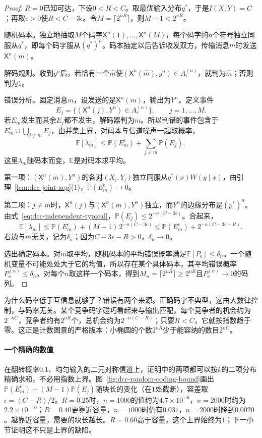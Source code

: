 \begin{proof}
$R=0$已知可达，下设$0<R<C$。取最优输入分布$q^{*}$，于是$I(X;Y)=C$；再取$\epsilon>0$使$R<C-3\epsilon$。令$M=\lceil2^{nR}\rceil$，则$M-1<2^{nR}$。

随机码本。独立地抽取$M$个码字$\mathsf{X}^n(1),\dots,\mathsf{X}^n(M)$，每个码字的$n$个符号独立同服从$q^{*}$，即每个码字服从$(q^{*})^n$。码本抽定以后告诉收发双方，传输消息$m$时发送$\mathsf{X}^n(m)$。

解码规则。收到$y^n$后，若恰有一个$\hat{m}$使$(\mathsf{X}^n(\hat{m}),y^n)\in A_{\epsilon}^{(n)}$，就判为$\hat{m}$；否则判为$1$。

错误分析。固定消息$m$，设发送的是$\mathsf{X}^n(m)$，输出为$Y^n$。定义事件
\[
 E_j=\bigl\{(\mathsf{X}^n(j),Y^n)\in A_{\epsilon}^{(n)}\bigr\},\qquad j=1,\dots,M .
\]
若$E_m$发生而其余$E_j$都不发生，解码器判为$m$。所以判错的事件包含于$E_m^{\mathrm{c}}\cup\bigcup_{j\neq m}E_j$，由并集上界，对码本与信道噪声一起取概率，
\[
 \mathbb{E}[\lambda_m]\leq\mathbb{P}(E_m^{\mathrm{c}})+\sum_{j\neq m}\mathbb{P}(E_j) ,
\]
这里$\lambda_m$随码本而变，$\mathbb{E}$是对码本求平均。

第一项：$(\mathsf{X}^n(m),Y^n)$的各对$(X_i,Y_i)$独立同服从$q^{*}(x)W(y\mid x)$，由引理~\ref{lem:dcc-joint-aep}(1)，$\mathbb{P}(E_m^{\mathrm{c}})\to0$。

第二项：$j\neq m$时，$\mathsf{X}^n(j)$与$(\mathsf{X}^n(m),Y^n)$独立，而$Y^n$的边缘分布是$(p^{*})^n$。由式~\eqref{eq:dcc-independent-typical}，$\mathbb{P}(E_j)\leq2^{-n(C-3\epsilon)}$。合起来，
\[
 \mathbb{E}[\lambda_m]\leq\mathbb{P}(E_m^{\mathrm{c}})+(M-1)\,2^{-n(C-3\epsilon)}\leq\mathbb{P}(E_m^{\mathrm{c}})+2^{-n(C-3\epsilon-R)} .
\]
右边与$m$无关，记为$\delta_n$；因为$C-3\epsilon-R>0$，$\delta_n\to0$。

选出确定码本。对$m$取平均，随机码本的平均错误概率满足$\mathbb{E}[P_{\mathrm{e}}]\leq\delta_n$。一个随机变量不可能处处大于它的均值，所以存在某个具体码本，其平均错误概率$P_{\mathrm{e}}^{(n)}\leq\delta_n$。对每个$n$取这样一个码本，得到$M_n=\lceil2^{nR}\rceil\geq2^{nR}$且$P_{\mathrm{e}}^{(n)}\to0$的码列。
\end{proof}

为什么码率低于互信息就够了？错误有两个来源。正确码字不典型，这由大数律控制，与码率无关。某个竞争码字碰巧看起来与输出匹配，每个竞争者的机会约为$2^{-nC}$，竞争者约有$2^{nR}$个，总机会约为$2^{-n(C-R)}$；只要$R<C$，它就按指数趋于零。这正是计数图景的严格版本：小椭圆的个数$2^{nR}$少于能容纳的数目$2^{nC}$。

\paragraph{一个精确的数值}
在翻转概率$0.1$、均匀输入的二元对称信道上，证明中的两项都可以按$k$的二项分布精确求和，不必用指数上界。图~\ref{fig:dcc-random-coding-bound}画出$\mathbb{P}(E_m^{\mathrm{c}})+(M-1)\mathbb{P}(E_j)$随块长的变化（在$1$处截断），容差取$\epsilon=(C-R)/2$。$R=0.25$时，$n=1000$的值约为$4.7\times10^{-6}$，$n=2000$时约为$2.2\times10^{-10}$；$R=0.40$更靠近容量，$n=1000$时仍有$0.031$，$n=2000$时降到$0.0020$。越靠近容量，需要的块长越长。$R=0.60$高于容量，这个上界始终为$1$；下一小节证明这不只是上界的缺陷。

